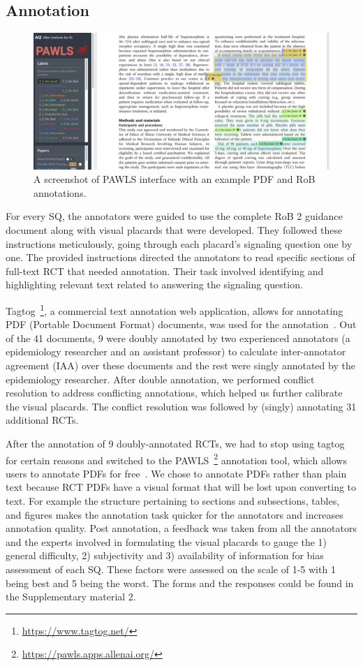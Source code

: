 \documentclass[sn-mathphys,Numbered]{sn-jnl}%
\theoremstyle{thmstyleone}%
\theoremstyle{thmstyletwo}%
\theoremstyle{thmstylethree}%
\begin{document}
\subsection{Annotation}
\label{annotation}
%
%
%
%
\begin{figure}[htb]
    \centering
    \includegraphics[width=0.80\columnwidth]{figures/pawls_layout.png}
    \caption{A screenshot of PAWLS interface with an example PDF and RoB annotations.}
    \label{fig:pawls}
\end{figure}
%
%
%
For every SQ, the annotators were guided to use the complete RoB 2 guidance document along with visual placards that were developed.
They followed these instructions meticulously, going through each placard's signaling question one by one.
The provided instructions directed the annotators to read specific sections of full-text RCT that needed annotation.
Their task involved identifying and highlighting relevant text related to answering the signaling question.



Tagtog~\footnote{\url{https://www.tagtog.net/}}, a commercial text annotation web application, allows for annotating PDF (Portable Document Format) documents, was used for the annotation~\cite{cejuela2014tagtog}.
Out of the 41 documents, 9 were doubly annotated by two experienced annotators (a epidemiology researcher and an assistant professor) to calculate inter-annotator agreement (IAA) over these documents and the rest were singly annotated by the epidemiology researcher.
After double annotation, we performed conflict resolution to address conflicting annotations, which helped us further calibrate the visual placards.
The conflict resolution was followed by (singly) annotating 31 additional RCTs.


After the annotation of 9 doubly-annotated RCTs, we had to stop using tagtog for certain reasons and switched to the PAWLS~\footnote{\url{https://pawls.apps.allenai.org/}} annotation tool, which allows users to annotate PDFs for free~\cite{neumann2021pawls}.
We chose to annotate PDFs rather than plain text because RCT PDFs have a visual format that will be lost upon converting to text. 
For example the structure pertaining to sections and subsections, tables, and figures makes the annotation task quicker for the annotators and increases annotation quality.
Post annotation, a feedback was taken from all the annotators and the experts involved in formulating the visual placards to gauge the 1) general difficulty, 2) subjectivity and 3) availability of information for bias assessment of each SQ.
These factors were assessed on the scale of 1-5 with 1 being best and 5 being the worst.
The forms and the responses could be found in the Supplementary material 2. %
%
%
%
\end{document}

